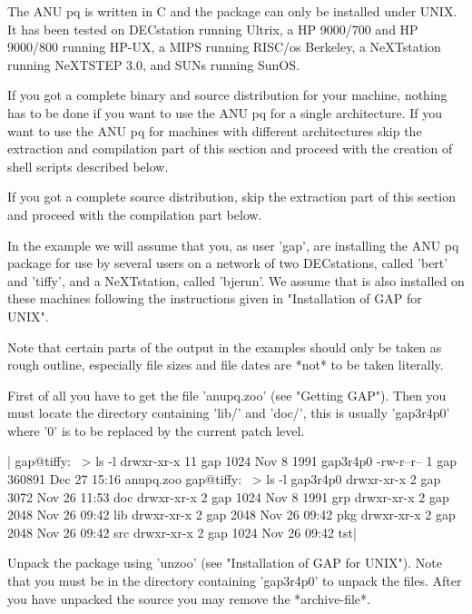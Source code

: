 The ANU  pq is written  in C and the  package can only be installed under
UNIX.  It has been tested on DECstation running Ultrix, a HP 9000/700 and
HP 9000/800 running HP-UX, a MIPS running RISC/os Berkeley, a NeXTstation
running NeXTSTEP 3.0, and SUNs running SunOS.

If you got  a complete binary  and source distribution for your  machine,
nothing has   to be done if  you  want to use   the ANU  pq for  a single
architecture. If  you want to use the  ANU pq for machines with different
architectures skip  the extraction and compilation  part of  this section
and proceed with the creation of shell scripts described below.

If you  got a complete source distribution,  skip the  extraction part of
this section and proceed with the compilation part below.

In the example we will assume that you, as user 'gap', are installing the
ANU pq package for use by several users on a network  of two DECstations,
called 'bert' and 'tiffy', and a NeXTstation,  called 'bjerun'. We assume
that  {\GAP}  is   also  installed  on   these  machines   following  the
instructions given in "Installation of GAP for UNIX".

Note that certain parts  of  the  output  in the examples should  only be
taken as rough outline, especially file sizes and file dates are *not* to
be taken literally.

First of  all you have to  get the file  'anupq.zoo' (see "Getting GAP").
Then you  must locate the {\GAP} directory  containing 'lib/' and 'doc/',
this is usually  'gap3r4p0' where '0'  is to be  replaced by  the current
patch level.

|    gap@tiffy:~ > ls -l
    drwxr-xr-x  11 gap     1024 Nov  8  1991 gap3r4p0
    -rw-r--r--   1 gap   360891 Dec 27 15:16 anupq.zoo
    gap@tiffy:~ > ls -l gap3r4p0
    drwxr-xr-x   2 gap     3072 Nov 26 11:53 doc
    drwxr-xr-x   2 gap     1024 Nov  8  1991 grp
    drwxr-xr-x   2 gap     2048 Nov 26 09:42 lib
    drwxr-xr-x   2 gap     2048 Nov 26 09:42 pkg
    drwxr-xr-x   2 gap     2048 Nov 26 09:42 src
    drwxr-xr-x   2 gap     1024 Nov 26 09:42 tst|

Unpack the package using 'unzoo'  (see "Installation  of GAP for  UNIX").
Note that  you must be in the  directory containing 'gap3r4p0'  to unpack
the files.    After you have  unpacked   the source  you may  remove  the
*archive-file*.

